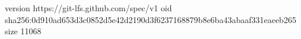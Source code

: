 version https://git-lfs.github.com/spec/v1
oid sha256:0d910ad653d3c0852d5e42d2190d3f6237168879b8e6ba43abaaf331eaeeb265
size 11068
